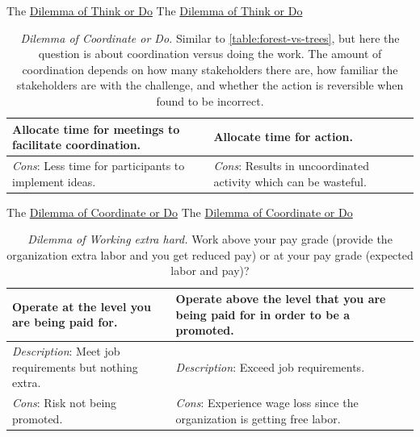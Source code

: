The \href{table:forest-vs-trees}{Dilemma of Think or Do}
The \href{table:forest-vs-trees}{Dilemma of Think or Do}
  

\begin{center}
\begin{table}[H] %
\begin{tabular}{ | m{\dilemmatablewidth}| m{\dilemmatablewidth} | } 
  \hline
  \textbf{Allocate time for meetings to facilitate coordination.} &
  \textbf{Allocate time for action.} \\
  \hline
  \textit{Cons}: Less time for participants to implement ideas. & 
  \textit{Cons}: Results in uncoordinated activity which can be wasteful. \\
  \hline
\end{tabular}
\caption{\textit{Dilemma of Coordinate or Do.}
Similar to \ref{table:forest-vs-trees}, but here the question is about coordination versus doing the work. The amount of coordination depends on how many stakeholders there are, how familiar the stakeholders are with the challenge, and whether the action is reversible when found to be incorrect.
}
\label{table:meetings-versus-work}
\end{table}
\end{center}


The \href{table:meetings-versus-work}{Dilemma of Coordinate or Do}
The \href{table:meetings-versus-work}{Dilemma of Coordinate or Do}


\begin{center}
\begin{table}[H] %
\begin{tabular}{ | m{\dilemmatablewidth}| m{\dilemmatablewidth} | } 
  \hline
  \textbf{Operate at the level you are being paid for.} &
  \textbf{Operate above the level that you are being paid for in order to be a promoted.} \\
  \hline
  \textit{Description}: Meet job requirements but nothing extra. &
  \textit{Description}: Exceed job requirements. \\
  \hline
  \textit{Cons}: Risk not being promoted. & 
  \textit{Cons}: Experience wage loss since the organization is getting free labor. \\
  \hline
\end{tabular}
\caption{\textit{Dilemma of Working extra hard.}
Work above your pay grade (provide the organization extra labor and you get reduced pay) or at your pay grade (expected labor and pay)?
}
\label{table:work_extra_or_work_as_expected}
\end{table}
\end{center}

